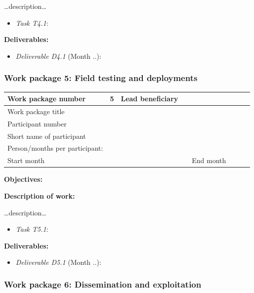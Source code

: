 \documentclass[]{article}
\begin{document}
\ldots{}description\ldots{}

\begin{itemize}

\item
  \emph{Task T4.1}:
\end{itemize}

\textbf{Deliverables:}

\begin{itemize}

\item
  \emph{Deliverable D4.1} (Month ..):
\end{itemize}

\subsubsection{Work package 5: Field testing and deployments}\label{work-package-5-field-testing-and-deployments}

\begin{longtable}[]{@{}llllllll@{}}
\toprule
Work package number & 5 & Lead beneficiary & & & & &\tabularnewline
\midrule
\endhead
Work package title & & & & & & &\tabularnewline
Participant number & & & & & & &\tabularnewline
Short name of participant & & & & & & &\tabularnewline
Person/months per participant: & & & & & & &\tabularnewline
Start month & & & & End month & & &\tabularnewline
\bottomrule
\end{longtable}

\textbf{Objectives:}

\textbf{Description of work:}

\ldots{}description\ldots{}

\begin{itemize}

\item
  \emph{Task T5.1}:
\end{itemize}

\textbf{Deliverables:}

\begin{itemize}

\item
  \emph{Deliverable D5.1} (Month ..):
\end{itemize}

\subsubsection{Work package 6: Dissemination and exploitation}\label{work-package-6-dissemination-and-exploitation}
\end{document}
